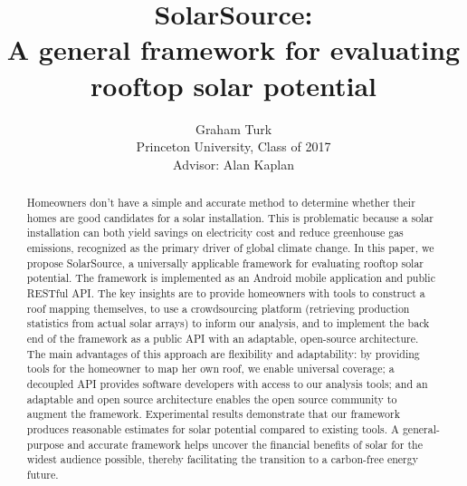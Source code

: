 \documentclass[pageno]{jpaper}
\begin{document}
\title{
SolarSource: \\ A general framework for evaluating rooftop solar potential\\}

\author{Graham Turk\\ Princeton University, Class of 2017\\Advisor: Alan Kaplan}

\date{}
\maketitle

\thispagestyle{empty}
\doublespacing
\begin{abstract}

Homeowners don't have a simple and accurate method to determine whether their homes are good candidates for a solar installation. This is problematic because a solar installation can both yield savings on electricity cost and reduce greenhouse gas emissions, recognized as the primary driver of global climate change. In this paper, we propose SolarSource, a universally applicable framework for evaluating rooftop solar potential. The framework is implemented as an Android mobile application and public RESTful API. The key insights are to provide homeowners with tools to construct a roof mapping themselves, to use a crowdsourcing platform (retrieving production statistics from actual solar arrays) to inform our analysis, and to implement the back end of the framework as a public API with an adaptable, open-source architecture. The main advantages of this approach are flexibility and adaptability: by providing tools for the homeowner to map her own roof, we enable universal coverage; a decoupled API provides software developers with access to our analysis tools; and an adaptable and open source architecture enables the open source community to augment the framework. Experimental results demonstrate that our framework produces reasonable estimates for solar potential compared to existing tools. A general-purpose and accurate framework helps uncover the financial benefits of solar for the widest audience possible, thereby facilitating the transition to a carbon-free energy future.
\end{abstract}

\bigskip
\bigskip
\bigskip
\end{document}
